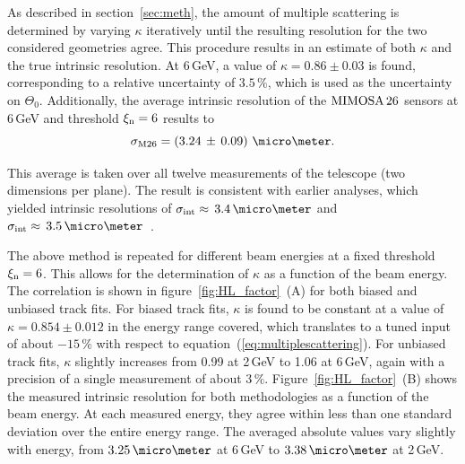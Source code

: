 As described in section~\ref{sec:meth}, the amount of multiple scattering is determined by varying $\kappa$ iteratively until the resulting resolution for the two considered geometries agree. 
This procedure results in an estimate of both $\kappa$ and the true intrinsic resolution. 
At 6\,GeV, a value of $\kappa = 0.86 \pm 0.03$ is found, corresponding to a relative uncertainty of $3.5\,\%$, which is used as the uncertainty on $\Theta_0$. 
Additionally, the average intrinsic resolution of the $\textrm{MIMOSA\,26}$ sensors at 6\,GeV and threshold $\xi_{\textrm{n}} = 6$ results to
\begin{equation}
 \sigma_{\textrm{M26}} = \left( 3.24\,\pm\, 0.09 \right)\,\micro\meter.  
\end{equation}

\noindent
This average is taken over all twelve measurements of the telescope (two dimensions per plane). 
The result is consistent with earlier analyses, which yielded intrinsic resolutions of $\sigmai \approx\,3.4\,\micro\meter$ \cite{ref:thomas} and $\sigmai \approx\,3.5\,\micro\meter$~\cite{ref:mimosa26}.

The above method is repeated for different beam energies at a fixed threshold $\xi_{\textrm{n}} = 6$. 
This allows for the determination of $\kappa$ as a function of the beam energy. 
The correlation is shown in figure~\ref{fig:HL_factor}~(A) for both biased and unbiased track fits. 
For biased track fits, $\kappa$ is found to be constant at a value of $\kappa = 0.854 \pm 0.012$ in the energy range covered,
 which translates to a tuned input of about $-15\,\%$ with respect to equation~(\ref{eq:multiplescattering}). 
For unbiased track fits, $\kappa$ slightly increases from 0.99 at 2\,GeV to 1.06 at 6\,GeV, again with a precision of a single measurement of about $3\,\%$.
Figure~\ref{fig:HL_factor}~(B) shows the measured intrinsic resolution for both methodologies as a function of the beam energy. 
At each measured energy, they agree within less than one standard deviation over the entire energy range. 
The averaged absolute values vary slightly with energy, from $3.25\,\micro\meter$ at 6\,GeV to $3.38\,\micro\meter$ at 2\,GeV. 

